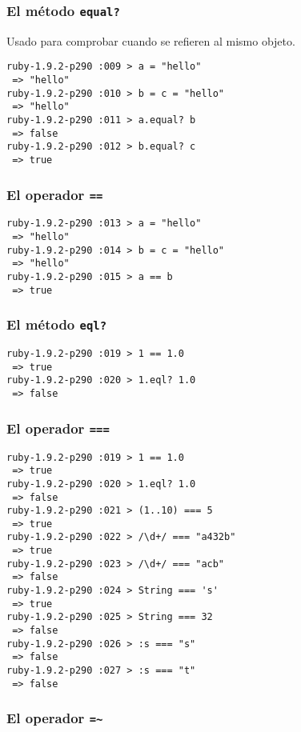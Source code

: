 \subsubsection{El método {\tt equal?}}
Usado para comprobar cuando se refieren al mismo objeto.

\begin{verbatim}
ruby-1.9.2-p290 :009 > a = "hello"
 => "hello" 
ruby-1.9.2-p290 :010 > b = c = "hello"
 => "hello" 
ruby-1.9.2-p290 :011 > a.equal? b
 => false 
ruby-1.9.2-p290 :012 > b.equal? c
 => true 

\end{verbatim}

\subsubsection{El operador {\tt ==}}

\begin{verbatim}
ruby-1.9.2-p290 :013 > a = "hello"
 => "hello" 
ruby-1.9.2-p290 :014 > b = c = "hello"
 => "hello" 
ruby-1.9.2-p290 :015 > a == b
 => true 
\end{verbatim}

\subsubsection{El método {\tt eql?}}

\begin{verbatim}
ruby-1.9.2-p290 :019 > 1 == 1.0
 => true 
ruby-1.9.2-p290 :020 > 1.eql? 1.0
 => false 

\end{verbatim}
\subsubsection{El operador {\tt ===}}

\begin{verbatim}
ruby-1.9.2-p290 :019 > 1 == 1.0
 => true 
ruby-1.9.2-p290 :020 > 1.eql? 1.0
 => false 
ruby-1.9.2-p290 :021 > (1..10) === 5
 => true 
ruby-1.9.2-p290 :022 > /\d+/ === "a432b"
 => true 
ruby-1.9.2-p290 :023 > /\d+/ === "acb"
 => false 
ruby-1.9.2-p290 :024 > String === 's'
 => true 
ruby-1.9.2-p290 :025 > String === 32
 => false 
ruby-1.9.2-p290 :026 > :s === "s"
 => false 
ruby-1.9.2-p290 :027 > :s === "t"
 => false 

\end{verbatim}

\subsubsection{El operador {\tt =\~{}}}


